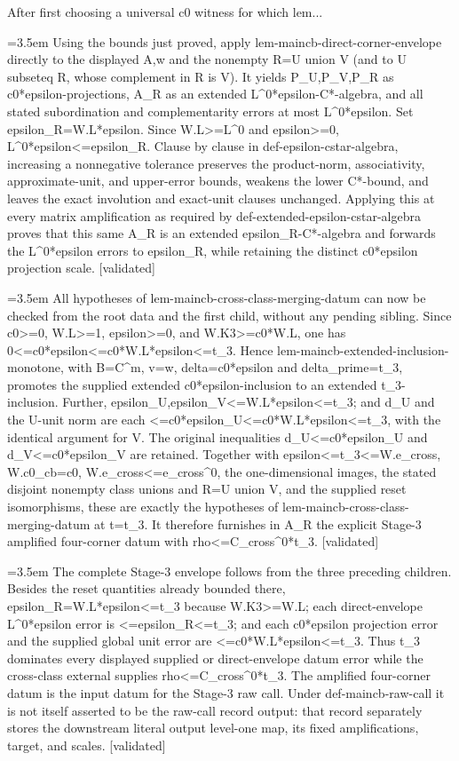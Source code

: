 \documentclass{article}
\newcommand{\step}[1]{\par\noindent\hangindent=3.5em\hangafter=1%
  \makebox[3.5em][l]{\textbf{#1.}}}
\newcommand{\steptag}[1]{\hfill{\small\textsf{[#1]}}}
\begin{document}
\begin{proofbox}{After first choosing a universal c0 witness for which lem...}
\step{1.6.2} Using the bounds just proved, apply lem-maincb-direct-corner-envelope directly to the displayed A,w and the nonempty R=U union V (and to U subseteq R, whose complement in R is V). It yields P\_U,P\_V,P\_R as c0*epsilon-projections, A\_R as an extended L\textasciicircum{}0*epsilon-C*-algebra, and all stated subordination and complementarity errors at most L\textasciicircum{}0*epsilon. Set epsilon\_R=W.L*epsilon. Since W.L>=L\textasciicircum{}0 and epsilon>=0, L\textasciicircum{}0*epsilon<=epsilon\_R. Clause by clause in def-epsilon-cstar-algebra, increasing a nonnegative tolerance preserves the product-norm, associativity, approximate-unit, and upper-error bounds, weakens the lower C*-bound, and leaves the exact involution and exact-unit clauses unchanged. Applying this at every matrix amplification as required by def-extended-epsilon-cstar-algebra proves that this same A\_R is an extended epsilon\_R-C*-algebra and forwards the L\textasciicircum{}0*epsilon errors to epsilon\_R, while retaining the distinct c0*epsilon projection scale. \steptag{validated} \\[4pt]
\step{1.6.3} All hypotheses of lem-maincb-cross-class-merging-datum can now be checked from the root data and the first child, without any pending sibling. Since c0>=0, W.L>=1, epsilon>=0, and W.K3>=c0*W.L, one has 0<=c0*epsilon<=c0*W.L*epsilon<=t\_3. Hence lem-maincb-extended-inclusion-monotone, with B=C\textasciicircum{}m, v=w, delta=c0*epsilon and delta\_prime=t\_3, promotes the supplied extended c0*epsilon-inclusion to an extended t\_3-inclusion. Further, epsilon\_U,epsilon\_V<=W.L*epsilon<=t\_3; and d\_U and the U-unit norm are each <=c0*epsilon\_U<=c0*W.L*epsilon<=t\_3, with the identical argument for V. The original inequalities d\_U<=c0*epsilon\_U and d\_V<=c0*epsilon\_V are retained. Together with epsilon<=t\_3<=W.e\_cross, W.c0\_cb=c0, W.e\_cross<=e\_cross\textasciicircum{}0, the one-dimensional images, the stated disjoint nonempty class unions and R=U union V, and the supplied reset isomorphisms, these are exactly the hypotheses of lem-maincb-cross-class-merging-datum at t=t\_3. It therefore furnishes in A\_R the explicit Stage-3 amplified four-corner datum with rho<=C\_cross\textasciicircum{}0*t\_3. \steptag{validated} \\[4pt]
\step{1.6.4} The complete Stage-3 envelope follows from the three preceding children. Besides the reset quantities already bounded there, epsilon\_R=W.L*epsilon<=t\_3 because W.K3>=W.L; each direct-envelope L\textasciicircum{}0*epsilon error is <=epsilon\_R<=t\_3; and each c0*epsilon projection error and the supplied global unit error are <=c0*W.L*epsilon<=t\_3. Thus t\_3 dominates every displayed supplied or direct-envelope datum error while the cross-class external supplies rho<=C\_cross\textasciicircum{}0*t\_3. The amplified four-corner datum is the input datum for the Stage-3 raw call. Under def-maincb-raw-call it is not itself asserted to be the raw-call record output: that record separately stores the downstream literal output level-one map, its fixed amplifications, target, and scales. \steptag{validated} \\[4pt]
\end{proofbox}
\end{document}
